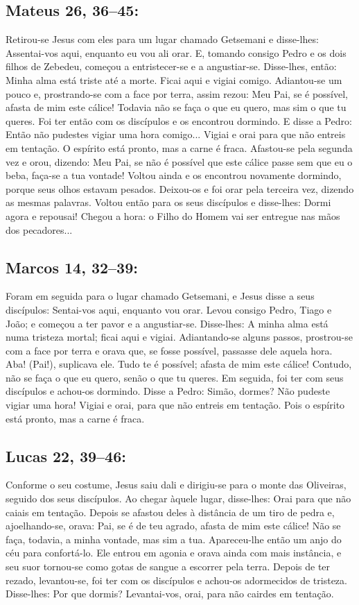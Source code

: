 \documentclass[10pt,a5paper]{book}
\newcommand{\from}[1]{\subsection*{#1}}
\begin{document}
\from{Mateus 26, 36--45:}

Retirou-se Jesus com eles para um lugar chamado Getsemani e disse-lhes:
Assentai-vos aqui, enquanto eu vou ali orar.
E, tomando consigo Pedro e os dois filhos de Zebedeu, começou a entristecer-se e a angustiar-se.
Disse-lhes, então:
Minha alma está triste até a morte.
Ficai aqui e vigiai comigo.
Adiantou-se um pouco e, prostrando-se com a face por terra, assim rezou:
Meu Pai, se é possível, afasta de mim este cálice! Todavia não se faça o que eu quero, mas sim o que tu queres.
Foi ter então com os discípulos e os encontrou dormindo.
E disse a Pedro:
Então não pudestes vigiar uma hora comigo...
Vigiai e orai para que não entreis em tentação.
O espírito está pronto, mas a carne é fraca.
Afastou-se pela segunda vez e orou, dizendo:
Meu Pai, se não é possível que este cálice passe sem que eu o beba, faça-se a tua vontade!
Voltou ainda e os encontrou novamente dormindo, porque seus olhos estavam pesados.
Deixou-os e foi orar pela terceira vez, dizendo as mesmas palavras.
Voltou então para os seus discípulos e disse-lhes:
Dormi agora e repousai! Chegou a hora:
o Filho do Homem vai ser entregue nas mãos dos pecadores...

\from{Marcos 14, 32--39:}

Foram em seguida para o lugar chamado Getsemani, e Jesus disse a seus discípulos:
Sentai-vos aqui, enquanto vou orar.
Levou consigo Pedro, Tiago e João;
e começou a ter pavor e a angustiar-se.
Disse-lhes:
A minha alma está numa tristeza mortal;
ficai aqui e vigiai.
Adiantando-se alguns passos, prostrou-se com a face por terra e orava que, se fosse possível, passasse dele aquela hora.
Aba! (Pai!), suplicava ele.
Tudo te é possível;
afasta de mim este cálice! Contudo, não se faça o que eu quero, senão o que tu queres.
Em seguida, foi ter com seus discípulos e achou-os dormindo.
Disse a Pedro:
Simão, dormes? Não pudeste vigiar uma hora!
Vigiai e orai, para que não entreis em tentação.
Pois o espírito está pronto, mas a carne é fraca.

\from{Lucas 22, 39--46:}

Conforme o seu costume, Jesus saiu dali e dirigiu-se para o monte das Oliveiras, seguido dos seus discípulos.
Ao chegar àquele lugar, disse-lhes:
Orai para que não caiais em tentação.
Depois se afastou deles à distância de um tiro de pedra e, ajoelhando-se, orava:
Pai, se é de teu agrado, afasta de mim este cálice! Não se faça, todavia, a minha vontade, mas sim a tua.
Apareceu-lhe então um anjo do céu para confortá-lo.
Ele entrou em agonia e orava ainda com mais instância, e seu suor tornou-se como gotas de sangue a escorrer pela terra.
Depois de ter rezado, levantou-se, foi ter com os discípulos e achou-os adormecidos de tristeza.
Disse-lhes:
Por que dormis? Levantai-vos, orai, para não cairdes em tentação.
\end{document}
